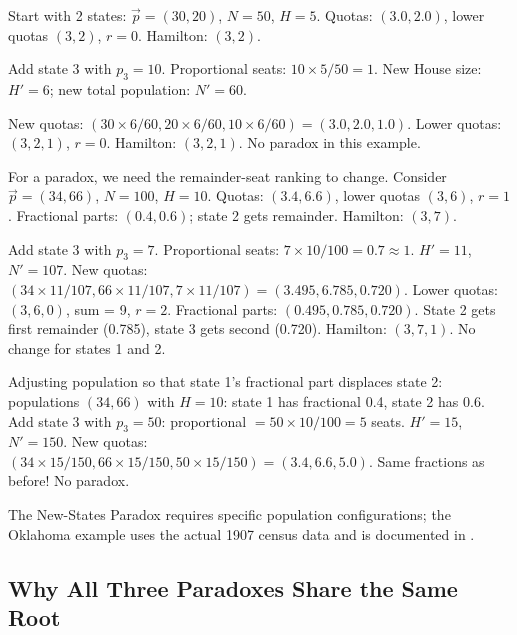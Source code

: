 \begin{example}
  Start with 2 states: $\vec{p} = (30, 20)$, $N = 50$, $H = 5$.
  Quotas: $(3.0, 2.0)$, lower quotas $(3, 2)$, $r = 0$.
  Hamilton: $(3, 2)$.

  Add state 3 with $p_3 = 10$.
  Proportional seats: $10 \times 5 / 50 = 1$.
  New House size: $H' = 6$; new total population: $N' = 60$.

  New quotas: $(30 \times 6/60, 20 \times 6/60, 10 \times 6/60)
  = (3.0, 2.0, 1.0)$.
  Lower quotas: $(3, 2, 1)$, $r = 0$.
  Hamilton: $(3, 2, 1)$.
  No paradox in this example.

  For a paradox, we need the remainder-seat ranking to change.
  Consider $\vec{p} = (34, 66)$, $N = 100$, $H = 10$.
  Quotas: $(3.4, 6.6)$, lower quotas $(3, 6)$, $r = 1$.
  Fractional parts: $(0.4, 0.6)$; state 2 gets remainder.
  Hamilton: $(3, 7)$.

  Add state 3 with $p_3 = 7$. Proportional seats: $7 \times 10/100 = 0.7 \approx 1$.
  $H' = 11$, $N' = 107$.
  New quotas: $(34 \times 11/107, 66 \times 11/107, 7 \times 11/107)
  = (3.495, 6.785, 0.720)$.
  Lower quotas: $(3, 6, 0)$, sum = 9, $r = 2$.
  Fractional parts: $(0.495, 0.785, 0.720)$.
  State 2 gets first remainder (0.785), state 3 gets second (0.720).
  Hamilton: $(3, 7, 1)$.
  No change for states 1 and 2.

  Adjusting population so that state 1's fractional part displaces state 2:
  populations $(34, 66)$ with $H = 10$: state 1 has fractional 0.4,
  state 2 has 0.6.
  Add state 3 with $p_3 = 50$: proportional $= 50 \times 10/100 = 5$ seats.
  $H' = 15$, $N' = 150$.
  New quotas: $(34\times 15/150, 66\times 15/150, 50\times 15/150)
  = (3.4, 6.6, 5.0)$.
  Same fractions as before! No paradox.

  The New-States Paradox requires specific population configurations;
  the Oklahoma example uses the actual 1907 census data and is
  documented in \citet{balinski1982fair}.
\end{example}

\subsection{Why All Three Paradoxes Share the Same Root}

